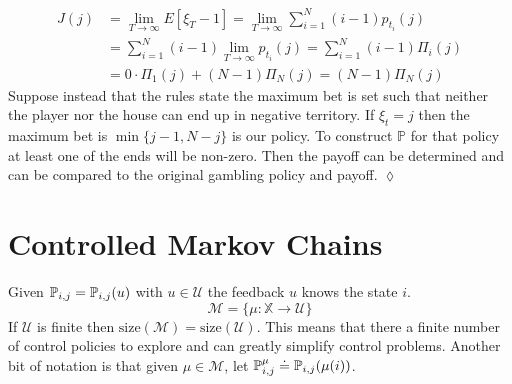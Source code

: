 \begin{example}
\begin{align*}
J(j) &= \lim_{T\to\infty}E[\xi_T-1] = \lim_{T\to\infty}\sum_{i=1}^N (i-1)p_{t_i}(j) \\
&= \sum_{i=1}^N (i-1)\lim_{T\to\infty} p_{t_i}(j) = \sum_{i=1}^N (i-1) \Pi_i(j) \\
&= 0\cdot \Pi_1(j) + (N-1)\Pi_N(j) = (N-1)\Pi_N(j)
\end{align*}
Suppose instead that the rules state the maximum bet is set such that neither the player nor the house can end up in negative territory. If $\xi_t=j$ then the maximum bet is $\min\{j-1,N-j\}$ is our policy. To construct $\mathbb{P}$ for that policy at least one of the ends will be non-zero. Then the payoff can be determined and can be compared to the original gambling policy and payoff.
$\lozenge$
\end{example}

\section{Controlled Markov Chains}
Given $\mathbb{P}_{i,j}=\mathbb{P}_{i,j}(u)$ with $u\in\mathcal{U}$ the feedback $u$ knows the state $i$.
$$\mathcal{M}=\{\mu:\mathbb{X}\rightarrow\mathcal{U}\}$$
If $\mathcal{U}$ is finite then $\text{size}(\mathcal{M})=\text{size}(\mathcal{U})$. This means that there a finite number of control policies to explore and can greatly simplify control problems. Another bit of notation is that given $\mu\in\mathcal{M}$, let $\mathbb{P}_{i,j}^\mu \doteq \mathbb{P}_{i,j}(\mu(i))$.

